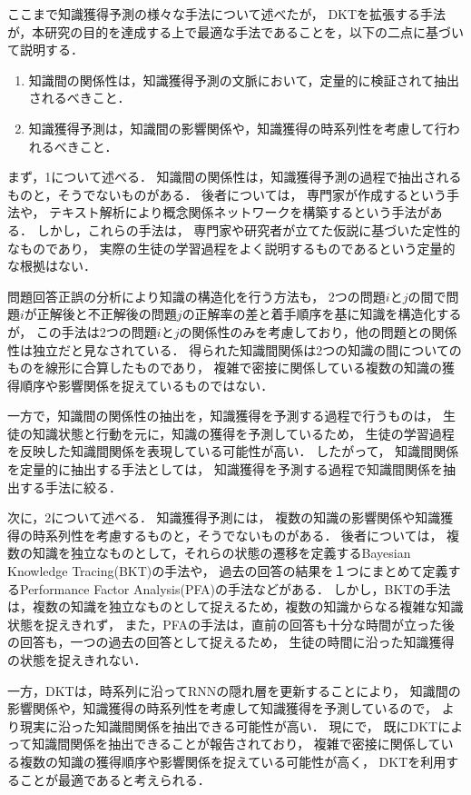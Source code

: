 ここまで知識獲得予測の様々な手法について述べたが，
DKTを拡張する手法が，本研究の目的を達成する上で最適な手法であることを，以下の二点に基づいて説明する．

\begin{enumerate}
	\item 知識間の関係性は，知識獲得予測の文脈において，定量的に検証されて抽出されるべきこと．
	\item 知識獲得予測は，知識間の影響関係や，知識獲得の時系列性を考慮して行われるべきこと．
\end{enumerate}

まず，1について述べる．
知識間の関係性は，知識獲得予測の過程で抽出されるものと，そうでないものがある．
後者については，
専門家が作成するという手法や，
テキスト解析により概念関係ネットワークを構築するという手法\cite{chen2008mining}がある．
しかし，これらの手法は，
専門家や研究者が立てた仮説に基づいた定性的なものであり，
実際の生徒の学習過程をよく説明するものであるという定量的な根拠はない．

問題回答正誤の分析により知識の構造化を行う方法も，%
2つの問題$i$と$j$の間で問題$i$が正解後と不正解後の問題$j$の正解率の差と着手順序を基に知識を構造化するが，
この手法は2つの問題$i$と$j$の関係性のみを考慮しており，他の問題との関係性は独立だと見なされている．
得られた知識間関係は2つの知識の間についてのものを線形に合算したものであり，
複雑で密接に関係している複数の知識の獲得順序や影響関係を捉えているものではない．

一方で，知識間の関係性の抽出を，知識獲得を予測する過程で行うものは，
生徒の知識状態と行動を元に，知識の獲得を予測しているため，
生徒の学習過程を反映した知識間関係を表現している可能性が高い．
したがって，
知識間関係を定量的に抽出する手法としては，
知識獲得を予測する過程で知識間関係を抽出する手法に絞る．


次に，2について述べる．
知識獲得予測には，
複数の知識の影響関係や知識獲得の時系列性を考慮するものと，そうでないものがある．
後者については，
複数の知識を独立なものとして，それらの状態の遷移を定義するBayesian Knowledge Tracing(BKT)の手法や，
過去の回答の結果を１つにまとめて定義するPerformance Factor Analysis(PFA)の手法などがある．
しかし，BKTの手法は，複数の知識を独立なものとして捉えるため，複数の知識からなる複雑な知識状態を捉えきれず，
また，PFAの手法は，直前の回答も十分な時間が立った後の回答も，一つの過去の回答として捉えるため，
生徒の時間に沿った知識獲得の状態を捉えきれない．

一方，DKTは，時系列に沿ってRNNの隠れ層を更新することにより，
知識間の影響関係や，知識獲得の時系列性を考慮して知識獲得を予測しているので，
より現実に沿った知識間関係を抽出できる可能性が高い．
現に\cite{piech2015deep}で，
既にDKTによって知識間関係を抽出できることが報告されており，
複雑で密接に関係している複数の知識の獲得順序や影響関係を捉えている可能性が高く，
DKTを利用することが最適であると考えられる．





